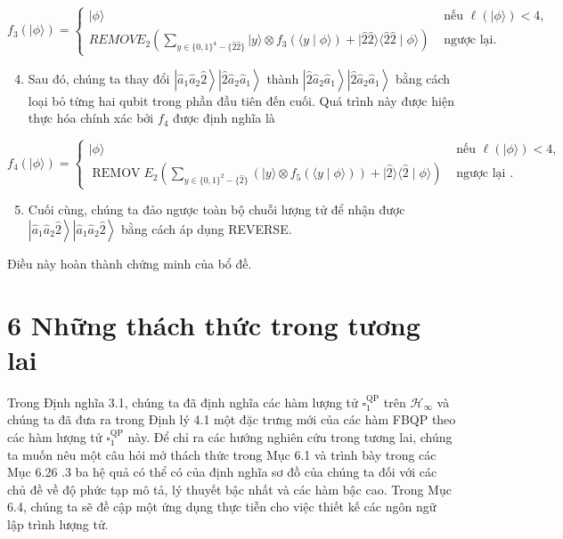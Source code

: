 \documentclass[10pt]{article}
\begin{document}
\begin{enumerate}
$$
f_{3}(|\phi\rangle)= \begin{cases}|\phi\rangle & \text { nếu } \ell(|\phi\rangle)<4, \\ R E M O V E_{2}\left(\sum_{y \in\{0,1\}^{4}-\{\hat{2} \hat{2}\}}|y\rangle \otimes f_{3}(\langle y \mid \phi\rangle)+|\hat{2} \hat{2}\rangle\langle\hat{2} \hat{2} \mid \phi\rangle\right) & \text { ngược lại. }\end{cases}
$$

\begin{enumerate}
  \setcounter{enumi}{3}
  \item Sau đó, chúng ta thay đổi $\left|\hat{a}_{1} \hat{a}_{2} \hat{2}\right\rangle\left|\hat{2} \hat{a}_{2} \hat{a}_{1}\right\rangle$ thành $\left|\hat{2} \hat{a}_{2} \hat{a}_{1}\right\rangle\left|\hat{2} \hat{a}_{2} \hat{a}_{1}\right\rangle$ bằng cách loại bỏ từng hai qubit trong phần đầu tiên đến cuối. Quá trình này được hiện thực hóa chính xác bởi $f_{4}$ được định nghĩa là
\end{enumerate}

$$
f_{4}(|\phi\rangle)= \begin{cases}|\phi\rangle & \text { nếu } \ell(|\phi\rangle)<4, \\ \operatorname{REMOV} E_{2}\left(\sum_{y \in\{0,1\}^{2}-\{\hat{2}\}}\left(|y\rangle \otimes f_{5}(\langle y \mid \phi\rangle)\right)+|\hat{2}\rangle\langle\hat{2} \mid \phi\rangle\right) & \text { ngược lại } .\end{cases}
$$

\begin{enumerate}
  \setcounter{enumi}{4}
  \item Cuối cùng, chúng ta đảo ngược toàn bộ chuỗi lượng tử để nhận được $\left|\hat{a}_{1} \hat{a}_{2} \hat{2}\right\rangle\left|\hat{a}_{1} \hat{a}_{2} \hat{2}\right\rangle$ bằng cách áp dụng REVERSE.
\end{enumerate}

Điều này hoàn thành chứng minh của bổ đề.

\section*{6 Những thách thức trong tương lai}
Trong Định nghĩa 3.1, chúng ta đã định nghĩa các hàm lượng tử $\square_{1}^{\mathrm{QP}}$ trên $\mathcal{H}_{\infty}$ và chúng ta đã đưa ra trong Định lý 4.1 một đặc trưng mới của các hàm FBQP theo các hàm lượng tử $\square_{1}^{\mathrm{QP}}$ này. Để chỉ ra các hướng nghiên cứu trong tương lai, chúng ta muốn nêu một câu hỏi mở thách thức trong Mục 6.1 và trình bày trong các Mục 6.26 .3 ba hệ quả có thể có của định nghĩa sơ đồ của chúng ta đối với các chủ đề về độ phức tạp mô tả, lý thuyết bậc nhất và các hàm bậc cao. Trong Mục 6.4, chúng ta sẽ đề cập một ứng dụng thực tiễn cho việc thiết kế các ngôn ngữ lập trình lượng tử.


\end{enumerate}
\end{document}
